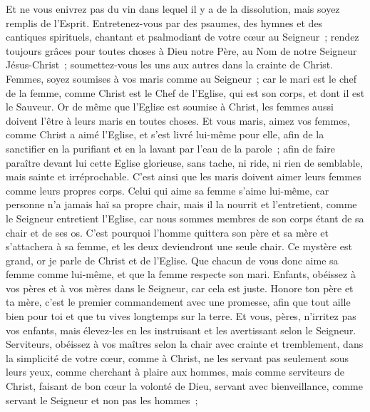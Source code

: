 \begin{multicols}{2}
Et ne vous enivrez pas du vin dans lequel il y a de la dissolution, mais soyez remplis de l'Esprit.
Entretenez-vous par des psaumes, des hymnes et des cantiques spirituels, chantant et psalmodiant de votre cœur au Seigneur~;
rendez toujours grâces pour toutes choses à Dieu notre Père, au Nom de notre Seigneur Jésus-Christ~;
soumettez-vous les uns aux autres dans la crainte de Christ.
Femmes, soyez soumises à vos maris comme au Seigneur~;
car le mari est le chef de la femme, comme Christ est le Chef de l'Eglise, qui est son corps, et dont il est le Sauveur.
Or de même que l'Eglise est soumise à Christ, les femmes aussi doivent l'être à leurs maris en toutes choses.
Et vous maris, aimez vos femmes, comme Christ a aimé l'Eglise, et s'est livré lui-même pour elle,
afin de la sanctifier en la purifiant et en la lavant par l'eau de la parole~;
afin de faire paraître devant lui cette Eglise glorieuse, sans tache, ni ride, ni rien de semblable, mais sainte et irréprochable.
C'est ainsi que les maris doivent aimer leurs femmes comme leurs propres corps. Celui qui aime sa femme s'aime lui-même,
car personne n'a jamais haï sa propre chair, mais il la nourrit et l'entretient, comme le Seigneur entretient l'Eglise,
car nous sommes membres de son corps étant de sa chair et de ses os.
C'est pourquoi l'homme quittera son père et sa mère et s'attachera à sa femme, et les deux deviendront une seule chair.
Ce mystère est grand, or je parle de Christ et de l'Eglise.
Que chacun de vous donc aime sa femme comme lui-même, et que la femme respecte son mari.
\VerseOne{}Enfants, obéissez à vos pères et à vos mères dans le Seigneur, car cela est juste.
Honore ton père et ta mère, c'est le premier commandement avec une promesse,
afin que tout aille bien pour toi et que tu vives longtemps sur la terre.
Et vous, pères, n'irritez pas vos enfants, mais élevez-les en les instruisant et les avertissant selon le Seigneur.
Serviteurs, obéissez à vos maîtres selon la chair avec crainte et tremblement, dans la simplicité de votre cœur, comme à Christ,
ne les servant pas seulement sous leurs yeux, comme cherchant à plaire aux hommes, mais comme serviteurs de Christ, faisant de bon cœur la volonté de Dieu,
servant avec bienveillance, comme servant le Seigneur et non pas les hommes~;

\end{multicols}
